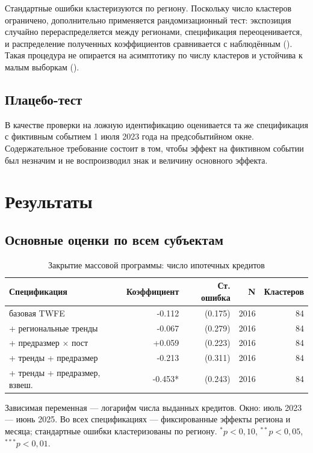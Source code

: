 \documentclass[
  russian,
  11pt,
]{article}
\begin{document}
Стандартные ошибки кластеризуются по региону. Поскольку число кластеров
ограничено, дополнительно применяется рандомизационный тест: экспозиция
случайно перераспределяется между регионами, спецификация
переоценивается, и распределение полученных коэффициентов сравнивается с
наблюдённым (). Такая процедура
не опирается на асимптотику по числу кластеров и устойчива к малым
выборкам ().

\subsection{Плацебо-тест}\label{ux43fux43bux430ux446ux435ux431ux43e-ux442ux435ux441ux442}

В качестве проверки на ложную идентификацию оценивается та же
спецификация с фиктивным событием 1 июля 2023 года на предсобытийном
окне. Содержательное требование состоит в том, чтобы эффект на фиктивном
событии был незначим и не воспроизводил знак и величину основного
эффекта.

\section{Результаты}\label{ux440ux435ux437ux443ux43bux44cux442ux430ux442ux44b}

\subsection{Основные оценки по всем
субъектам}\label{ux43eux441ux43dux43eux432ux43dux44bux435-ux43eux446ux435ux43dux43aux438-ux43fux43e-ux432ux441ux435ux43c-ux441ux443ux431ux44aux435ux43aux442ux430ux43c}

\begin{table}[htbp]
\centering
\small
\caption{Закрытие массовой программы: число ипотечных кредитов}
\label{tab:count}
\begin{tabular}{lrrrr}
\toprule
Спецификация & Коэффициент & Ст. ошибка & N & Кластеров \\
\midrule
базовая TWFE & -0.112 & (0.175) & 2016 & 84 \\
+ региональные тренды & -0.067 & (0.279) & 2016 & 84 \\
+ предразмер × пост & +0.059 & (0.223) & 2016 & 84 \\
+ тренды + предразмер & -0.213 & (0.311) & 2016 & 84 \\
+ тренды + предразмер, взвеш. & -0.453* & (0.243) & 2016 & 84 \\
\bottomrule
\end{tabular}
\par\smallskip\begin{minipage}{0.92\textwidth}\footnotesize
Зависимая переменная — логарифм числа выданных кредитов. Окно: июль 2023 — июнь 2025. Во всех спецификациях — фиксированные эффекты региона и месяца; стандартные ошибки кластеризованы по региону. $^{*}p<0{,}10$, $^{**}p<0{,}05$, $^{***}p<0{,}01$. 
\end{minipage}
\end{table}
\end{document}
